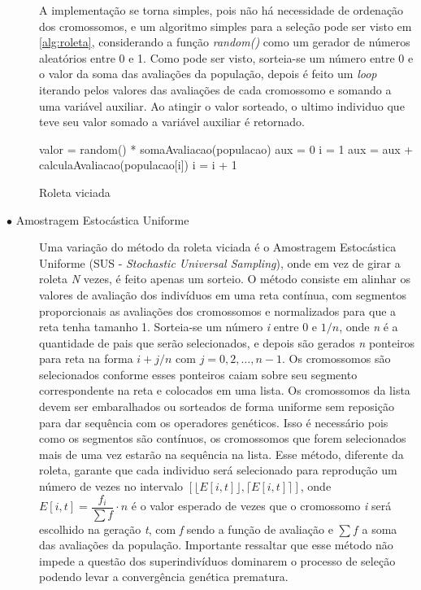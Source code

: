 \begin{description}
A implementação se torna simples, pois não há necessidade de ordenação dos cromossomos, e um algoritmo simples para a seleção pode ser visto em \autoref{alg:roleta}, considerando a função \textit{random()} como um gerador de números aleatórios entre 0 e 1. Como pode ser visto, sorteia-se um número entre 0 e o valor da soma das avaliações da população, depois é feito um \textit{loop} iterando pelos valores das avaliações de cada cromossomo e somando a uma variável auxiliar. Ao atingir o valor sorteado, o ultimo individuo que teve seu valor somado a variável auxiliar é retornado.

\begin{algorithm}
	\LinesNumbered
	valor = random() * somaAvaliacao(populacao)\;
	aux = 0\;
	i = 1\;
	 {
			aux = aux + calculaAvaliacao(populacao[i])\;
			i = i + 1\;
	}
	\caption{Roleta viciada}
	\label{alg:roleta}
\end{algorithm}

\item[$\bullet$ Amostragem Estocástica Uniforme] \text{}

Uma variação do método da roleta viciada é o Amostragem Estocástica Uniforme (SUS - \textit{Stochastic Universal Sampling}), onde em vez de girar a roleta \textit{N} vezes, é feito apenas um sorteio. O método consiste em alinhar os valores de avaliação dos indivíduos em uma reta contínua, com segmentos proporcionais as avaliações dos cromossomos e normalizados para que a reta tenha tamanho 1. Sorteia-se um número \textit{i} entre 0 e \(1/n\), onde \textit{n} é a quantidade de pais que serão selecionados, e depois são gerados \textit{n} ponteiros para reta na forma \(i + j/n \) com \(j = 0, 2, \dots, n-1 \). Os cromossomos são selecionados conforme esses ponteiros caiam sobre seu segmento correspondente na reta e colocados em uma lista. Os cromossomos da lista devem ser embaralhados ou sorteados de forma uniforme sem reposição para dar sequência com os operadores genéticos. Isso é necessário pois como os segmentos são contínuos, os cromossomos que forem selecionados mais de uma vez estarão na sequência na lista. Esse método, diferente da roleta, garante que cada individuo será selecionado para reprodução um número de vezes no intervalo \(\left[ \lfloor E[i,t] \rfloor , \lceil E[i,t] \rceil \right] \), onde \(E[i,t] = \dfrac{f_i}{\sum f} \cdot n\) é o valor esperado de vezes que o cromossomo \textit{i} será escolhido na geração \textit{t}, com \textit{f} sendo a função de avaliação e \(\sum f\) a soma das avaliações da população. Importante ressaltar que esse método não impede a questão dos superindivíduos dominarem o processo de seleção podendo levar a convergência genética prematura. 


\end{description}
